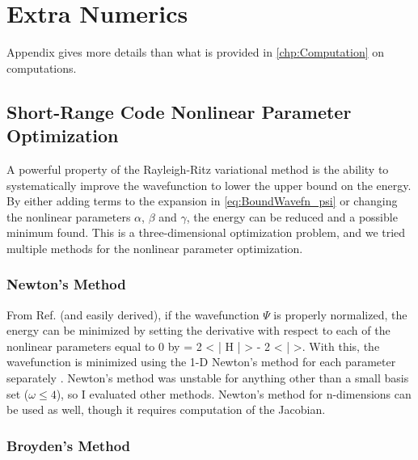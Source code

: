 \documentclass[Dissertation.tex]{subfiles}
\begin{document}
\chapter{Extra Numerics}
\label{chp:ExtraNumerics}

\iftoggle{UNT}{This}{\lettrine{\textcolor{startcolor}{T}}{his}}
Appendix gives more
details than what is provided in \cref{chp:Computation} on
computations.

\section{Short-Range Code Nonlinear Parameter Optimization}
\label{sec:BoundOptimization}

A powerful property of the Rayleigh-Ritz variational method is the 
ability to systematically improve the wavefunction to lower the upper bound 
on the energy. By either adding terms to the expansion in
\cref{eq:BoundWavefn_psi} or changing the nonlinear parameters $\alpha$,
$\beta$ and $\gamma$, the energy can be reduced and a possible minimum
found. This is a three-dimensional optimization problem, and we tried 
multiple methods for the nonlinear parameter optimization.

\subsection{Newton's Method}
\label{sec:Newton}
From Ref. \cite{Yan1999} (and easily derived), if the wavefunction $\Psi$
is properly normalized, the energy can be minimized by setting the
derivative with respect to each of the nonlinear parameters equal to 0 by
\beq
{} = 2 \left< \Psi \Big| H \Big| \frac{\partial\Psi}{\partial \alpha} \right> - 2 \left< \Psi \Big| \frac{\partial\Psi}{\partial \alpha} \right>.
\label{eq:EnergyDerivativeNorm}
\eeq
With this, the wavefunction is minimized using the 1-D Newton's method for 
each parameter separately \cite{Sauer2006}. Newton's method was unstable for 
anything other than a small basis set ($\omega \leq 4$), so I evaluated other 
methods. Newton's method for n-dimensions can be used as well, though it 
requires computation of the Jacobian.

\subsection{Broyden's Method}
\label{sec:Broyden}
\end{document}
